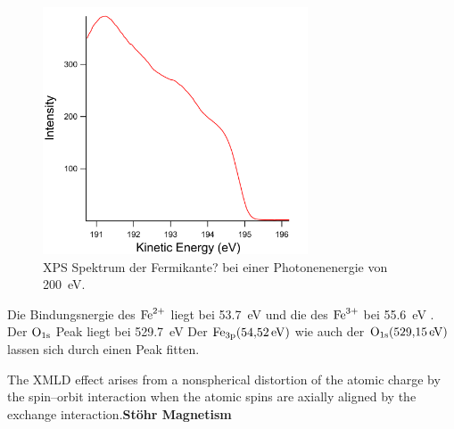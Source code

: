             \begin{figure}
                \centering
                \includegraphics[width=0.7\textwidth]{./content/pictures/FeO/Fermi.png}
                \caption{XPS Spektrum der Fermikante? bei einer Photonenenergie von \SI{200}{\electronvolt}.}
                \label{fig:XPSFermi}
            \end{figure}

            Die Bindungsnergie des $\ce{Fe}^{2+}$ liegt bei \SI{53.7}{\electronvolt} und die des $\ce{Fe}^{3+}$ bei \SI{55.6}{\electronvolt} \cite{FeO_7}.
            Der  $\ce{O}_{1\text{s}}$ Peak liegt bei \SI{529.7}{\electronvolt} \cite{}
            Der $\ce{Fe}_{3\text{p}} (\SI{54.52}{\electronvolt})$ wie auch der $\ce{O}_{1\text{s}} (\SI{529.15}{\electronvolt})$ lassen sich durch einen Peak fitten.

            The XMLD effect arises from a nonspherical distortion of the atomic charge by the spin–orbit interaction when the atomic spins are axially aligned by the exchange interaction.\textbf{Stöhr Magnetism}


